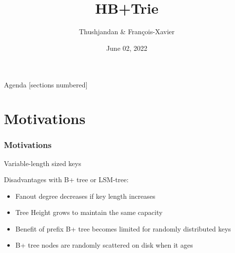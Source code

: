 \documentclass[aspectratio=169]{beamer}
\title{HB+Trie}
\date{June 02, 2022}
\author{Thushjandan \& François-Xavier}
\institute{Data Management Data Structures}
\begin{document}
\maketitle

\begin{frame}{Agenda}
    [sections numbered]
    \tableofcontents
\end{frame}
\section{Motivations}
\begin{frame}[t]
    \frametitle{Motivations}
       Variable-length sized keys
    
    Disadvantages with B+ tree or LSM-tree:
    \begin{itemize}
    	\item Fanout degree decreases if key length increases
    	\item Tree Height grows to maintain the same capacity
    	\item Benefit of prefix B+ tree becomes limited for randomly distributed keys
    	\item B+ tree nodes are randomly scattered on disk when it ages 
    \end{itemize}
\end{frame}
\end{document}
